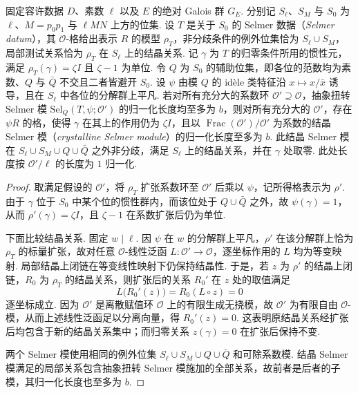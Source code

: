 \begin{lemma}
\label{lem:c-selmer-base-change}
\emitthmsource
固定容许数据 $D$、素数 $\ell$ 以及 $E$ 的绝对 Galois 群 $G_E$. 分别记 $S_\ell$、$S_M$ 与 $S_0$ 为 $\ell$、$M=p_0p_1$ 与 $\ell MN$ 上方的位集.
设 $T$ 是关于 $S_0$ 的 Selmer 数据（\emph{Selmer datum}），其 $\mathcal O$-格给出表示 $R$ 的模型 $\rho_T$，非分歧条件的例外位集恰为 $S_\ell\cup S_M$，局部测试关系恰为 $\rho_T$ 在 $S_\ell$ 上的结晶关系. 记 $\gamma$ 为 $T$ 的归零条件所用的惯性元，满足 $\rho_T(\gamma)=\zeta I$ 且 $\zeta-1$ 为单位.
令 $Q$ 为 $S_0$ 的辅助位集，即各位的范数均为素数、$Q$ 与 $\bar Q$ 不交且二者皆避开 $S_0$.
设 $\psi$ 由模 $Q$ 的 idèle 类特征沿 $x\mapsto x/\bar x$ 诱导，且在 $S_\ell$ 中各位的分解群上平凡. 若对所有充分大的系数环 $\mathcal O'\supseteq\mathcal O$，抽象扭转 Selmer 模 $\mathrm{Sel}_Q(T,\psi;\mathcal O')$ 的归一化长度均至多为 $b$，则对所有充分大的 $\mathcal O'$，存在 $\psi R$ 的格，使得 $\gamma$ 在其上的作用仍为 $\zeta I$，且以 $\operatorname{Frac}(\mathcal O')/\mathcal O'$ 为系数的结晶 Selmer 模（\emph{crystalline Selmer module}）的归一化长度至多为 $b$. 此结晶 Selmer 模在 $S_\ell\cup S_M\cup Q\cup\bar Q$ 之外非分歧，满足 $S_\ell$ 上的结晶关系，并在 $\gamma$ 处取零. 此处长度按 $\mathcal O'/\ell$ 的长度为 $1$ 归一化.
\end{lemma}
\begin{proof}
取满足假设的 $\mathcal O'$，将 $\rho_T$ 扩张系数环至 $\mathcal O'$ 后乘以 $\psi$，记所得格表示为 $\rho'$.
由于 $\gamma$ 位于 $S_0$ 中某个位的惯性群内，而该位处于 $Q\cup\bar Q$ 之外，故 $\psi(\gamma)=1$，从而 $\rho'(\gamma)=\zeta I$，且 $\zeta-1$ 在系数扩张后仍为单位.

下面比较结晶关系. 固定 $w\mid\ell$. 因 $\psi$ 在 $w$ 的分解群上平凡，$\rho'$ 在该分解群上恰为 $\rho_T$ 的标量扩张，故对任意 $\mathcal O$-线性泛函 $L\colon\mathcal O'\to\mathcal O$，逐坐标作用的 $L$ 均为等变映射. 局部结晶上闭链在等变线性映射下仍保持结晶性. 于是，若 $z$ 为 $\rho'$ 的结晶上闭链，$R_0$ 为 $\rho_T$ 的结晶关系，则扩张后的关系 $R_0'$ 在 $z$ 处的取值满足
\[
 L\bigl(R_0'(z)\bigr)=R_0(L\circ z)=0
\]
逐坐标成立. 因为 $\mathcal O'$ 是离散赋值环 $\mathcal O$ 上的有限生成无挠模，故 $\mathcal O'$ 为有限自由 $\mathcal O$-模，从而上述线性泛函足以分离向量，得 $R_0'(z)=0$. 这表明原结晶关系经扩张后均包含于新的结晶关系集中；而归零关系 $z(\gamma)=0$ 在扩张后保持不变.

两个 Selmer 模使用相同的例外位集 $S_\ell\cup S_M\cup Q\cup\bar Q$ 和可除系数模. 结晶 Selmer 模满足的局部关系包含抽象扭转 Selmer 模施加的全部关系，故前者是后者的子模，其归一化长度也至多为 $b$.
\end{proof}

